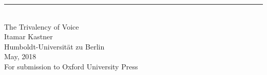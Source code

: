 \singlespacing
\begin{center}
\rule{165pt}{0pt} \\
\vspace{1cm}
\LARGE{The Trivalency of Voice}\\
\vspace{2cm}
\large{Itamar Kastner} \\
\vspace{0.4cm}
\normalsize{Humboldt-Universit\"at zu Berlin} \\
\vspace{1cm}
\normalsize{May, 2018} \\
\vspace{4cm}
\hfill \large{For submission to Oxford University Press}\\

\end{center}